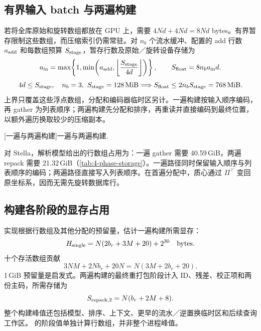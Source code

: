\subsection{有界输入 batch 与两遍构建}

若将全库原始和旋转数组都放在 GPU 上，需要 $4Nd+4Nd=8Nd$ bytes。有界暂存限制这些数组，而压缩索引仍需常驻。对 $n_b$ 个流水缓冲、配置的 add 行数 $a_{\rm add}$ 和每数组预算 $S_{\rm stage}$，暂存行数及原始／旋转设备存储为
\begin{equation}
 a_{\rm in}=\max\!\left\{1,\min\!\left(a_{\rm add},
 \left\lfloor\frac{S_{\rm stage}}{4d}\right\rfloor\right)\right\},
 \qquad S_{\rm float}=8n_ba_{\rm in}d.
 \label{eq:4-staging-rows}
\end{equation}
\[
 4d\leq S_{\rm stage},\quad n_b=3,\ S_{\rm stage}=128\,\mathrm{MiB}
 \Longrightarrow S_{\rm float}\leq2n_bS_{\rm stage}=768\,\mathrm{MiB}.
\]
上界只覆盖这些浮点数组，分配和编码器临时区另计。一遍构建按输入顺序编码，再 gather 为列表顺序；两遍构建先分配和排序，再重读并直接编码到最终位置，以额外遍历换取较少的压缩副本。

\par\medskip\noindent\begin{minipage}{\linewidth}
\captionsetup{hypcap=false}
\centering

[一遍与两遍构建]{一遍与两遍构建.}
\label{fig:2-add-paths}
\end{minipage}\par\medskip

对 Stella，解析模型给出的行数组占用为：一遍 gather 需要 40.59\,GiB，两遍 repack 需要 21.32\,GiB（\cref{tab:4-phase-storage}）。一遍路径同时保留输入顺序与列表顺序的编码；两遍路径直接写入列表顺序。在首遍分配中，质心通过 $\Pi^\top$ 变回原坐标系，因而无需先旋转数据库行。

\subsection{构建各阶段的显存占用}

实现根据行数组及其他分配的预留量，估计一遍构建所需显存：
\begin{equation}
 H_{\rm single}=N(2b_r+3M+20)+2^{30}\quad\text{bytes}.
 \label{eq:4-peak-heuristic}
\end{equation}
十个存活数组贡献
\[
 3NM+2Nb_r+20N=N(3M+2b_r+20).
\]
1\,GiB 预留量是启发式。两遍构建的最终重打包阶段计入 ID、残差、校正项和两份主码，所需存储为
\begin{equation}
 S_{\rm repack,2}=N(b_r+2M+8).
 \label{eq:4-two-pass-repack}
\end{equation}
整个构建峰值还包括模型、排序、上下文、更早的流水／逆置换临时区和后续查询工作区。 的阶段值单独计算行数组，并非整个进程峰值。

